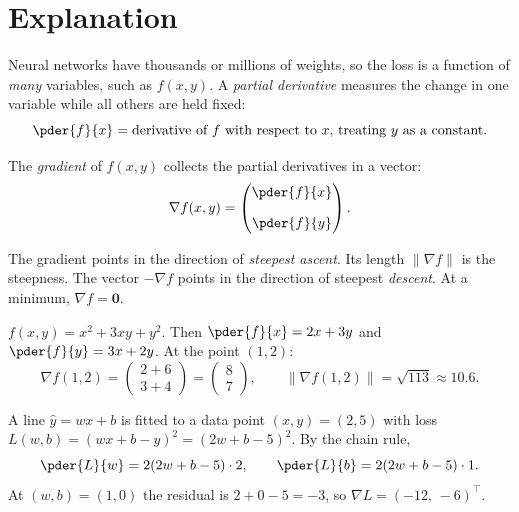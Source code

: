 \label{ch:gradient}

\section*{Explanation}
Neural networks have thousands or millions of weights, so the loss is a function of \emph{many} variables, such as $f(x,y)$. A \emph{partial derivative} measures the change in one variable while all others are held fixed:
\[
\pder{f}{x}=\text{derivative of }f\text{ with respect to }x\text{, treating }y\text{ as a constant.}
\]
\begin{definition}
The \emph{gradient} of $f(x,y)$ collects the partial derivatives in a vector:
\[
\nabla f(x,y)=\begin{pmatrix}\pder{f}{x}\\[1em]\pder{f}{y}\end{pmatrix}.
\]
\end{definition}

\begin{keyidea}
The gradient points in the direction of \emph{steepest ascent}. Its length $\|\nabla f\|$ is the steepness. The vector $-\nabla f$ points in the direction of steepest \emph{descent}. At a minimum, $\nabla f=\mathbf 0$.
\end{keyidea}

\begin{example}
$f(x,y)=x^2+3xy+y^2$. Then $\pder{f}{x}=2x+3y$ and $\pder{f}{y}=3x+2y$. At the point $(1,2)$:
\[
\nabla f(1,2)=\begin{pmatrix}2+6\\3+4\end{pmatrix}=\begin{pmatrix}8\\7\end{pmatrix},\qquad \|\nabla f(1,2)\|=\sqrt{113}\approx 10.6.
\]
\end{example}

\begin{example}
A line $\hat y=wx+b$ is fitted to a data point $(x,y)=(2,5)$ with loss $L(w,b)=(wx+b-y)^2=(2w+b-5)^2$. By the chain rule,
\[
\pder{L}{w}=2(2w+b-5)\cdot 2,\qquad \pder{L}{b}=2(2w+b-5)\cdot 1.
\]
At $(w,b)=(1,0)$ the residual is $2+0-5=-3$, so $\nabla L=(-12,\,-6)^\top$.
\end{example}

